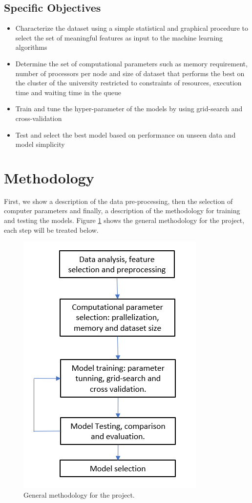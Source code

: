 \documentclass[]{article}
\begin{document}
\subsection{Specific Objectives}
\begin{itemize}
	\item Characterize the dataset using a simple statistical and graphical procedure to select the set of meaningful features as input to the machine learning algorithms
	\item Determine the set of computational parameters such as memory requirement, number of processors per node and size of dataset that performs the best on the cluster of the university restricted to constraints of resources, execution time and waiting time in the queue
	\item Train and tune the hyper-parameter of the models by using grid-search and cross-validation
	\item Test and select the best model based on performance on unseen data and model simplicity
\end{itemize}
\section{Methodology}
 First, we show a description of the data pre-processing, then the selection of computer parameters and finally, a description of the methodology for training and testing the models. Figure \ref{fig:generalmet} shows the general methodology for the project, each step will be treated below.  
\begin{figure}[h!]
	\centering
	\includegraphics[width=0.5\linewidth]{TeX_files/Imagenes/general_met}
	\caption{General methodology for the project.}
	\label{fig:generalmet}
\end{figure}
\end{document}

